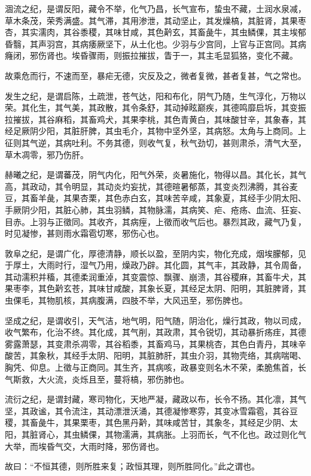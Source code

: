 \documentclass{article}%
\begin{document}
涸流之纪，是谓反阳，藏令不举，化气乃昌，长气宣布，蛰虫不藏，土润水泉减，草木条茂，荣秀满盛。其气滞，其用渗泄，其动坚止，其发燥槁，其脏肾，其果枣杏，其实濡肉，其谷黍稷，其味甘咸，其色黅玄，其畜彘牛，其虫鳞倮，其主埃郁昏翳，其声羽宫，其病痿厥坚下，从土化也。少羽与少宫同，上官与正宫同。其病癃闭，邪伤肾也。埃昏骤雨，则振拉摧拔，眚于一，其主毛显狐狢，变化不藏。

故乘危而行，不速而至，暴疟无德，灾反及之，微者复微，甚者复甚，气之常也。

发生之纪，是谓启陈，土疏泄，苍气达，阳和布化，阴气乃随，生气淳化，万物以荣。其化生，其气美，其政散，其令条舒，其动掉眩巅疾，其德鸣靡启坼，其变振拉摧拔，其谷麻稻，其畜鸡犬，其果李桃，其色青黄白，其味酸甘辛，其象春，其经足厥阴少阳，其脏肝脾，其虫毛介，其物中坚外坚，其病怒。太角与上商同。上征则其气逆，其病吐利。不务其德，则收气复，秋气劲切，甚则肃杀，清气大至，草木凋零，邪乃伤肝。

赫曦之纪，是谓蕃茂，阴气内化，阳气外荣，炎暑施化，物得以昌。其化长，其气高，其政动，其令明显，其动炎灼妄扰，其德暄暑郁蒸，其变炎烈沸腾，其谷麦豆，其畜羊彘，其果杏栗，其色赤白玄，其味苦辛咸，其象夏，其经手少阴太阳、手厥阴少阳，其脏心肺，其虫羽鳞，其物脉濡，其病笑、疟、疮疡、血流、狂妄、目赤。上羽与正徵同。其收齐，其病痓，上徵而收气后也。暴烈其政，藏气乃复，时见凝惨，甚则雨水霜雹切寒，邪伤心也。

敦阜之纪，是谓广化，厚德清静，顺长以盈，至阴内实，物化充成，烟埃朦郁，见于厚土，大雨时行，湿气乃用，燥政乃辟。其化圆，其气丰，其政静，其令周备，其动濡积并稸，其德柔润重淖，其变震惊、飘骤、崩溃，其谷稷麻，其畜牛犬，其果枣李，其色黅玄苍，其味甘咸酸，其象长夏，其经足太阴、阳明，其脏脾肾，其虫倮毛，其物肌核，其病腹满，四肢不举，大风迅至，邪伤脾也。

坚成之纪，是谓收引，天气洁，地气明，阳气随，阴治化，燥行其政，物以司成，收气繁布，化治不终。其化成，其气削，其政肃，其令锐切，其动暴折疡疰，其德雾露萧瑟，其变肃杀凋零，其谷稻黍，其畜鸡马，其果桃杏，其色白青丹，其味辛酸苦，其象秋，其经手太阴、阳明，其脏肺肝，其虫介羽，其物壳络，其病喘喝、胸凭、仰息。上徵与正商同。其生齐，其病咳，政暴变则名木不荣，柔脆焦首，长气斯救，大火流，炎烁且至，蔓将槁，邪伤肺也。

流衍之纪，是谓封藏，寒司物化，天地严凝，藏政以布，长令不扬。其化凛，其气坚，其政谧，其令流注，其动漂泄沃涌，其德凝惨寒雰，其变冰雪霜雹，其谷豆稷，其畜彘牛，其果栗枣，其色黑丹黅，其味咸苦甘，其象冬，其经足少阴、太阳，其脏肾心，其虫鳞倮，其物濡满，其病胀。上羽而长，气不化也。政过则化气大举，而埃昏气交，大雨时降，邪伤肾也。

故曰：“不恒其德，则所胜来复；政恒其理，则所胜同化。”此之谓也。
\end{document}
